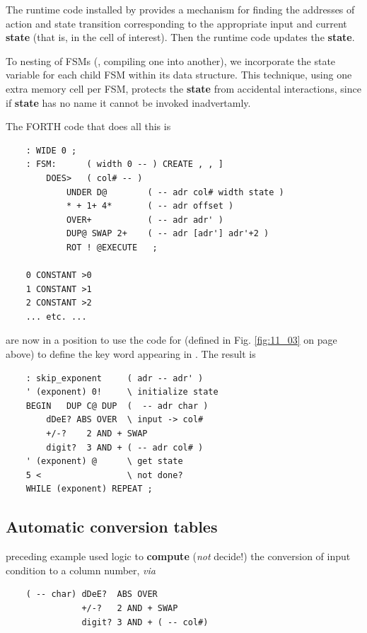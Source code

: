 The runtime code installed by  provides a mechanism for finding the addresses of action and state transition corresponding to the appropriate input and current \textbf{state} (that is, in the cell of interest). Then the runtime code updates the \textbf{state}.

To  nesting of FSMs (\ie, compiling one into another), we incorporate the state variable for each child FSM within its data structure. This technique, using one extra memory cell per FSM, protects the \textbf{state} from accidental interactions, since if \textbf{state} has no name it cannot be invoked inadvertamly.

The FORTH code that does all this is
\begin{lstlisting}
    : WIDE 0 ;
    : FSM:      ( width 0 -- ) CREATE , , ]
        DOES>   ( col# -- )
            UNDER D@        ( -- adr col# width state )
            * + 1+ 4*       ( -- adr offset )
            OVER+           ( -- adr adr' )
            DUP@ SWAP 2+    ( -- adr [adr'] adr'+2 )
            ROT ! @EXECUTE   ;

    0 CONSTANT >0
    1 CONSTANT >1
    2 CONSTANT >2
    ... etc. ...
\end{lstlisting}

 are now in a position to use the code for  (defined in Fig. \ref{fig:11_03} on page \pageref{fig:11_03} above) to define the key word  appearing in . The result is

\begin{lstlisting}
    : skip_exponent     ( adr -- adr' )
    ' (exponent) 0!     \ initialize state
    BEGIN   DUP C@ DUP  (  -- adr char )
        dDeE? ABS OVER  \ input -> col#
        +/-?    2 AND + SWAP
        digit?  3 AND + ( -- adr col# )
    ' (exponent) @      \ get state
    5 <                 \ not done?
    WHILE (exponent) REPEAT ;
\end{lstlisting}

\subsection{Automatic conversion tables}
 preceding example used logic to \textbf{compute} (\textit{not} decide!) the conversion of input condition to a column number, \textit{via}

\begin{lstlisting}
    ( -- char) dDeE?  ABS OVER
               +/-?   2 AND + SWAP
               digit? 3 AND + ( -- col#)
\end{lstlisting}

